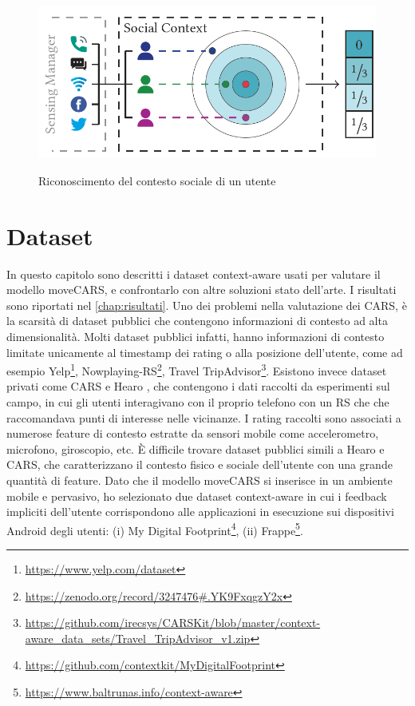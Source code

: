 \documentclass[12pt,italian]{report}
\begin{document}
\begin{figure}
  \centering
  \includegraphics[scale=0.80]{immagini/ego-array.png}
  \caption{Riconoscimento del contesto sociale di un utente}
  \label{fig:ego-array}	
  \cite{ego-net}
\end{figure}

% 
% 
\chapter{Dataset} \label{chap:datasets}
In questo capitolo sono descritti i dataset context-aware usati per valutare il modello moveCARS, e confrontarlo con altre soluzioni stato dell'arte. I risultati sono riportati nel \autoref{chap:risultati}. Uno dei problemi nella valutazione dei CARS, è la scarsità di dataset pubblici che contengono informazioni di contesto ad alta dimensionalità. Molti dataset pubblici infatti, hanno informazioni di contesto limitate unicamente al timestamp dei rating o alla posizione dell'utente, come ad esempio Yelp\footnote{\url{https://www.yelp.com/dataset}}, Nowplaying-RS\footnote{\url{https://zenodo.org/record/3247476\#.YK9FxqgzY2x}}, Travel TripAdvisor\footnote{\url{https://github.com/irecsys/CARSKit/blob/master/context-aware_data_sets/Travel_TripAdvisor_v1.zip}}. Esistono invece dataset privati come CARS \cite{context-aware-deep-learning} e Hearo \cite{latent-context}, che contengono i dati raccolti da esperimenti sul campo, in cui gli utenti interagivano con il proprio telefono con un RS che che raccomandava punti di interesse nelle vicinanze. I rating raccolti sono associati a numerose feature di contesto estratte da sensori mobile come accelerometro, microfono, giroscopio, etc.
\`E difficile trovare dataset pubblici simili a Hearo e CARS, che caratterizzano il contesto fisico e sociale dell'utente con una grande quantità di feature. Dato che il modello moveCARS si inserisce in un ambiente mobile e pervasivo, ho selezionato due dataset context-aware in cui i feedback impliciti dell'utente corrispondono alle applicazioni in esecuzione sui dispositivi Android degli utenti: (i) My Digital Footprint\footnote{\url{https://github.com/contextkit/MyDigitalFootprint}}, (ii) Frappe\footnote{\url{https://www.baltrunas.info/context-aware}}.
\end{document}
